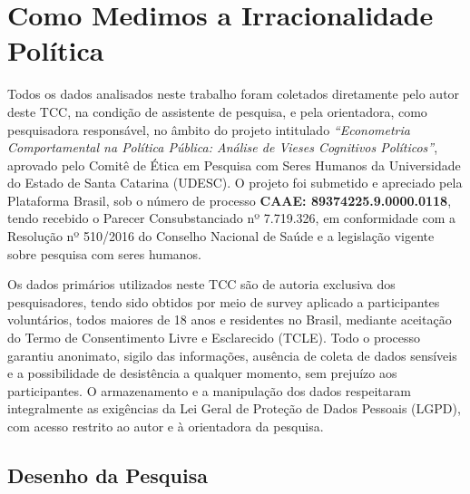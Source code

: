 \chapter{Como Medimos a Irracionalidade Política}

Todos os dados analisados neste trabalho foram coletados diretamente pelo autor deste TCC, na condição de assistente de pesquisa, e pela orientadora, como pesquisadora responsável, no âmbito do projeto intitulado \textit{“Econometria Comportamental na Política Pública: Análise de Vieses Cognitivos Políticos”}, aprovado pelo Comitê de Ética em Pesquisa com Seres Humanos da Universidade do Estado de Santa Catarina (UDESC). O projeto foi submetido e apreciado pela Plataforma Brasil, sob o número de processo \textbf{CAAE: 89374225.9.0000.0118}, tendo recebido o Parecer Consubstanciado nº 7.719.326, em conformidade com a Resolução nº 510/2016 do Conselho Nacional de Saúde e a legislação vigente sobre pesquisa com seres humanos.

Os dados primários utilizados neste TCC são de autoria exclusiva dos pesquisadores, tendo sido obtidos por meio de survey aplicado a participantes voluntários, todos maiores de 18 anos e residentes no Brasil, mediante aceitação do Termo de Consentimento Livre e Esclarecido (TCLE). Todo o processo garantiu anonimato, sigilo das informações, ausência de coleta de dados sensíveis e a possibilidade de desistência a qualquer momento, sem prejuízo aos participantes. O armazenamento e a manipulação dos dados respeitaram integralmente as exigências da Lei Geral de Proteção de Dados Pessoais (LGPD), com acesso restrito ao autor e à orientadora da pesquisa.

\section{Desenho da Pesquisa}

